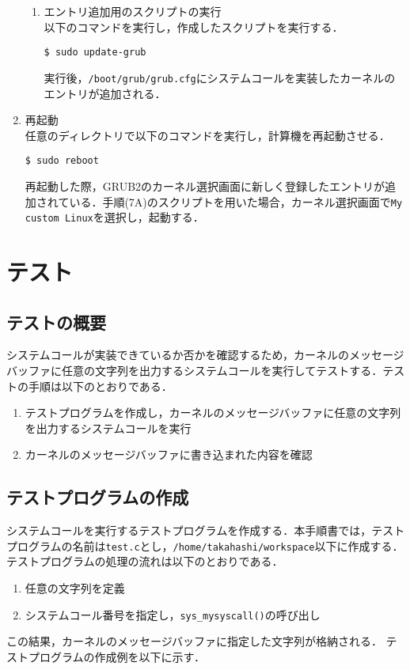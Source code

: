 \documentclass[12pt]{jsarticle}
\begin{document}
\begin{enumerate}
\begin{enumerate}
\item エントリ追加用のスクリプトの実行\\
  以下のコマンドを実行し，作成したスクリプトを実行する．
\begin{verbatim}
$ sudo update-grub
\end{verbatim}
実行後，\verb|/boot/grub/grub.cfg|にシステムコールを実装したカーネルのエントリが追加される．
  \end{enumerate}
  
\item 再起動 \\
  任意のディレクトリで以下のコマンドを実行し，計算機を再起動させる．
\begin{verbatim}
$ sudo reboot
\end{verbatim}
再起動した際，GRUB2のカーネル選択画面に新しく登録したエントリが追加されている．手順(7A)のスクリプトを用いた場合，カーネル選択画面で\verb|My custom Linux|を選択し，起動する．

\end{enumerate}

\newpage
\section{テスト}
\label{sec:test}
\subsection{テストの概要}
システムコールが実装できているか否かを確認するため，カーネルのメッセージバッファに任意の文字列を出力するシステムコールを実行してテストする．テストの手順は以下のとおりである．

\begin{enumerate}
\item テストプログラムを作成し，カーネルのメッセージバッファに任意の文字列を出力するシステムコールを実行
\item カーネルのメッセージバッファに書き込まれた内容を確認
\end{enumerate}

\subsection{テストプログラムの作成}
システムコールを実行するテストプログラムを作成する．本手順書では，テストプログラムの名前は\verb|test.c|とし，\verb|/home/takahashi/workspace|以下に作成する．テストプログラムの処理の流れは以下のとおりである．

\begin{enumerate}
\item 任意の文字列を定義
\item システムコール番号を指定し，\verb|sys_mysyscall()|の呼び出し
\end{enumerate}
この結果，カーネルのメッセージバッファに指定した文字列が格納される．
テストプログラムの作成例を以下に示す．
\end{document}
